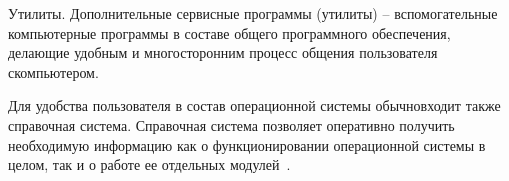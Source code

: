 Утилиты. Дополнительные сервисные программы (утилиты) – вспомогательные компьютерные   программы   в   составе   общего   программного   обеспечения, делающие   удобным   и   многосторонним   процесс   общения   пользователя   скомпьютером.

Для   удобства   пользователя   в   состав   операционной   системы   обычновходит также справочная система. Справочная система позволяет оперативно получить необходимую информацию как о функционировании операционной системы в целом, так и о работе ее отдельных модулей~\cite{Oc2}.


